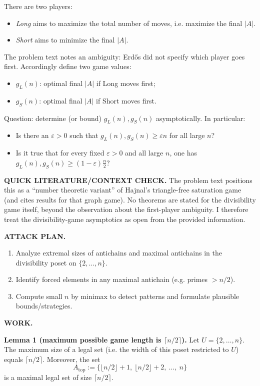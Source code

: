 There are two players:
\begin{itemize}
\item \emph{Long} aims to maximize the total number of moves, i.e. maximize the final $|A|$.
\item \emph{Short} aims to minimize the final $|A|$.
\end{itemize}

The problem text notes an ambiguity: Erd\H{o}s did not specify which player goes first.
Accordingly define two game values:
\begin{itemize}
\item $g_L(n)$: optimal final $|A|$ if Long moves first;
\item $g_S(n)$: optimal final $|A|$ if Short moves first.
\end{itemize}

Question: determine (or bound) $g_L(n),g_S(n)$ asymptotically. In particular:
\begin{itemize}
\item Is there an $\varepsilon>0$ such that $g_L(n),g_S(n)\ge \varepsilon n$ for all large $n$?
\item Is it true that for every fixed $\varepsilon>0$ and all large $n$, one has $g_L(n),g_S(n)\ge (1-\varepsilon)\frac n2$?
\end{itemize}

\medskip
\noindent\textbf{QUICK LITERATURE/CONTEXT CHECK.}
The problem text positions this as a ``number theoretic variant'' of Hajnal's triangle-free saturation game (and cites results for that graph game). No theorems are stated for the divisibility game itself, beyond the observation about the first-player ambiguity.
I therefore treat the divisibility-game asymptotics as open from the provided information.

\medskip
\noindent\textbf{ATTACK PLAN.}
\begin{enumerate}
\item Analyze extremal sizes of antichains and maximal antichains in the divisibility poset on $\{2,\dots,n\}$.
\item Identify forced elements in any maximal antichain (e.g. primes $>n/2$).
\item Compute small $n$ by minimax to detect patterns and formulate plausible bounds/strategies.
\end{enumerate}

\medskip
\noindent\textbf{WORK.}

\noindent\textbf{Lemma 1 (maximum possible game length is $\lceil n/2\rceil$).}
Let $U=\{2,\dots,n\}$. The maximum size of a legal set (i.e. the width of this poset restricted to $U$) equals $\lceil n/2\rceil$.
Moreover, the set
\[
A_\mathrm{top}:=\{\lfloor n/2\rfloor+1,\ \lfloor n/2\rfloor+2,\ \dots,\ n\}
\]
is a maximal legal set of size $\lceil n/2\rceil$.

